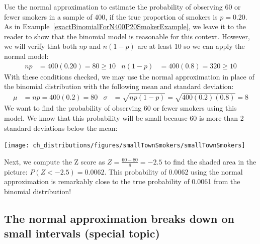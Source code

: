 \begin{example}{Use the normal approximation to estimate the probability of observing 60 or fewer smokers in a sample of 400, if the true proportion of smokers is $p=0.20$.}\label{approxBinomialForN400P20SmokerExample}
As in Example~\ref{exactBinomialForN400P20SmokerExample},  we leave it to the reader to show that the binomial model is reasonable for this context. However, we will verify that both $np$ and $n(1-p)$ are at least 10 so we can apply the normal model:
\begin{align*}
np&=400(0.20)=80\ge 10
&
n(1-p)&=400(0.8)=320\ge 10
\end{align*}
With these conditions checked, we may use the normal approximation in place of the binomial distribution with the following mean and standard deviation:
\begin{align*}
\mu &= np = 400(0.2)=80
&
\sigma &= \sqrt{np(1-p)} = \sqrt{400(0.2)(0.8)}= 8
\end{align*}
We want to find the probability of observing 60 or fewer smokers using this model. We know that this probability will be small because 60 is more than 2 standard deviations below the mean:
\begin{center}
\texttt{[image: ch\_distributions/figures/smallTownSmokers/smallTownSmokers]}
\end{center}
Next, we compute the Z score as $Z=\frac{60 - 80}{8} = -2.5$ to find the shaded area in the picture: $P(Z < -2.5) = 0.0062$. This probability of 0.0062 using the normal approximation is remarkably close to the true probability of 0.0061 from the binomial distribution!
\end{example}

%
%
%
%


\subsection{The normal approximation breaks down on small intervals (special topic)}

